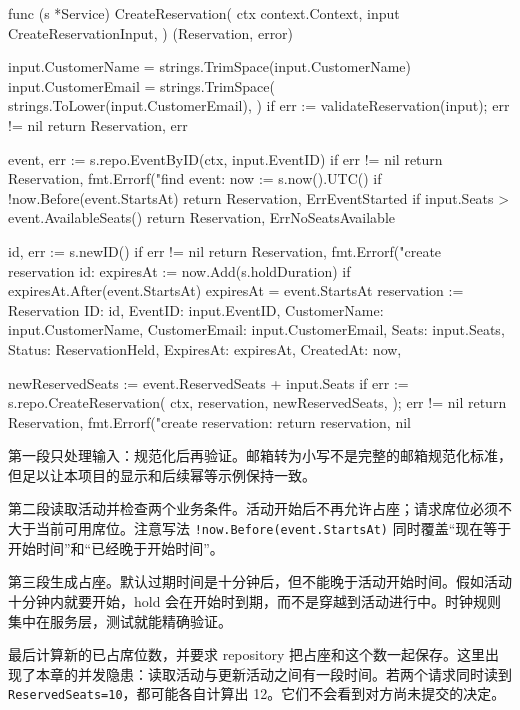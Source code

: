 \begin{gocode}[title={代码清单 12.20 \texttt{service.go}：创建限时占座}]
func (s *Service) CreateReservation(
    ctx context.Context,
    input CreateReservationInput,
) (Reservation, error) {
    input.CustomerName = strings.TrimSpace(input.CustomerName)
    input.CustomerEmail = strings.TrimSpace(
        strings.ToLower(input.CustomerEmail),
    )
    if err := validateReservation(input); err != nil {
        return Reservation{}, err
    }

    event, err := s.repo.EventByID(ctx, input.EventID)
    if err != nil {
        return Reservation{}, fmt.Errorf("find event: %
    }
    now := s.now().UTC()
    if !now.Before(event.StartsAt) {
        return Reservation{}, ErrEventStarted
    }
    if input.Seats > event.AvailableSeats() {
        return Reservation{}, ErrNoSeatsAvailable
    }

    id, err := s.newID()
    if err != nil {
        return Reservation{}, fmt.Errorf("create reservation id: %
    }
    expiresAt := now.Add(s.holdDuration)
    if expiresAt.After(event.StartsAt) {
        expiresAt = event.StartsAt
    }
    reservation := Reservation{
        ID: id, EventID: input.EventID,
        CustomerName: input.CustomerName,
        CustomerEmail: input.CustomerEmail,
        Seats: input.Seats, Status: ReservationHeld,
        ExpiresAt: expiresAt, CreatedAt: now,
    }

    newReservedSeats := event.ReservedSeats + input.Seats
    if err := s.repo.CreateReservation(
        ctx, reservation, newReservedSeats,
    ); err != nil {
        return Reservation{}, fmt.Errorf("create reservation: %
    }
    return reservation, nil
}
\end{gocode}

第一段只处理输入：规范化后再验证。邮箱转为小写不是完整的邮箱规范化标准，但足以让本项目的显示和后续幂等示例保持一致。

第二段读取活动并检查两个业务条件。活动开始后不再允许占座；请求席位必须不大于当前可用席位。注意写法 \texttt{!now.Before(event.StartsAt)} 同时覆盖“现在等于开始时间”和“已经晚于开始时间”。

第三段生成占座。默认过期时间是十分钟后，但不能晚于活动开始时间。假如活动十分钟内就要开始，hold 会在开始时到期，而不是穿越到活动进行中。时钟规则集中在服务层，测试就能精确验证。

最后计算新的已占席位数，并要求 repository 把占座和这个数一起保存。这里出现了本章的并发隐患：读取活动与更新活动之间有一段时间。若两个请求同时读到 \texttt{ReservedSeats=10}，都可能各自计算出 12。它们不会看到对方尚未提交的决定。

